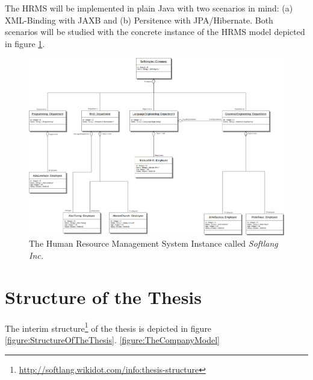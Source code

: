 \documentclass[runningheads,a4paper]{llncs}
\newcommand{\footnoteurl}[1]{\footnote{\url{#1}}}
\begin{document}
The HRMS will be implemented in plain Java with two scenarios in mind:
(a) XML-Binding with JAXB
and (b) Persitence with JPA/Hibernate.
Both scenarios will be studied with the concrete instance of the HRMS model depicted in figure \ref{figure:TheCompanyInstanceCalledSoftlangInc}.

\begin{figure}[h!]
\centering
\includegraphics[width=.6\textwidth]{softlanginc.png}
\caption{The Human Resource Management System Instance called \textit{Softlang Inc.}}
\label{figure:TheCompanyInstanceCalledSoftlangInc}
\end{figure}

\section{Structure of the Thesis}
\label{section:StructureOfTheThesis}
The interim structure\footnoteurl{http://softlang.wikidot.com/info:thesis-structure} of the thesis is depicted in figure \ref{figure:StructureOfTheThesis}.
\ref{figure:TheCompanyModel}
\end{document}
